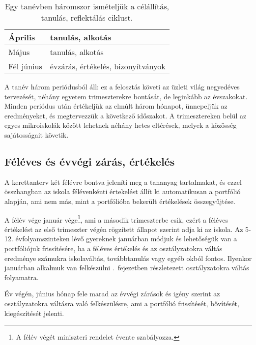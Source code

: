 \begin{table}
\begin{tabular}{ l|l }
    Április          &
    tanulás, alkotás
    \\ \hline

    Május            &
    tanulás, alkotás
    \\ \hline

    Fél június       &
    évzárás, értékelés, bizonyítványok
  \end{tabular}
  \caption{Egy tanévben háromszor ismételjük a célállítás, tanulás,
    reflektálás ciklust.}
  \label{tbl:tanevritmus}
\end{table}

A tanév három periódusból áll: ez a felosztás követi az üzleti világ negyedéves
tervezését, néhány egyetem trimeszterekre bontását, de leginkább az évszakokat.
Minden periódus után értékeljük az elmúlt három hónapot, ünnepeljük az
eredményeket, és megtervezzük a következő időszakot.  A trimesztereken belül az
egyes mikroiskolák között lehetnek néhány hetes eltérések, melyek a közösség
sajátosságait követik.

\subsection{Féléves és évvégi zárás, értékelés}
\label{sec:feleves_bontas}
A kerettanterv két félévre bontva jeleníti meg a tananyag tartalmakat, és ezzel összhangban az iskola félévenkénti értekelést állít ki automatikusan a portfólió alapján, ami nem más, mint a portfólióba bekerült értékelések összegyűjtése. 

A félév vége január vége\footnote{A félév végét miniszteri rendelet évente szabályozza.}, ami a második trimeszterbe esik, ezért a féléves értékelést az első trimeszter végén rögzített állapot szerint adja ki az iskola.  Az 5-12. évfolyamszinteken lévő gyereknek januárban módjuk és lehetőségük van a portfóliójuk frissítésére, ha a féléves értékelés és az osztályzatokra váltás eredménye számukra iskolaváltás, továbbtanulás vagy egyéb okból fontos. Ilyenkor januárban alkalmuk van felkészülni .~fejezetben részletezett osztályzatokra váltás folyamatra.

Év végén, június hónap fele marad az évvégi zárások és igény szerint az osztályzatokra váltásra való felkészülésre, ami a portfólió frissítését, bővítését, kiegészítését jelenti.